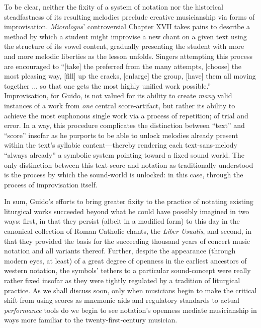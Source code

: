     To be clear, neither the fixity of a system of notation nor the historical steadfastness of its resulting melodies preclude creative musicianship via forms of improvisation. \textit{Micrologus}' controversial Chapter XVII takes pains to describe a method by which a student might improvise a new chant on a given text using the structure of its vowel content, gradually presenting the student with more and more melodic liberties as the lesson unfolds. Singers attempting this process are encouraged to ``[take] the preferred from the many attempts, [choose] the most pleasing way, [fill] up the cracks, [enlarge] the group, [have] them all moving together ... so that one gets the most highly unified work possible.''\autocite[70]{Arezzo_1943} Improvisation, for Guido, is not valued for its ability to create \textit{many} valid instances of a work from \textit{one} central score-artifact, but rather its ability to achieve the most euphonous single work via a process of repetition; of trial and error. In a way, this procedure complicates the distinction between ``text'' and ``score'' insofar as he  purports to be able to unlock melodies already present within the text's syllabic content---thereby rendering each text-sans-melody ``always already'' a symbolic system pointing toward a fixed sound world. The only distinction between this text-score and notation as traditionally understood is the process by which the sound-world is unlocked: in this case, through the process of improvisation itself.

    In sum, Guido's efforts to bring greater fixity to the practice of notating existing liturgical works succeeded beyond what he could have possibly imagined in two ways: first, in that they persist (albeit in a modified form) to this day in the canonical collection of Roman Catholic chants, the \textit{Liber Usualis}, and second, in that they provided the basis for the succeeding thousand years of concert music notation and all variants thereof. Further, despite the appearance (through modern eyes, at least) of a great degree of openness in the earliest ancestors of western notation, the symbols' tethers to a particular sound-concept were really rather fixed insofar as they were tightly regulated by a tradition of liturgical practice. As we shall discuss soon, only when musicians begin to make the critical shift from using scores as mnemonic aids and regulatory standards to actual \textit{performance} tools do we begin to see notation's openness mediate musicianship in ways more familiar to the twenty-first-century musician.

